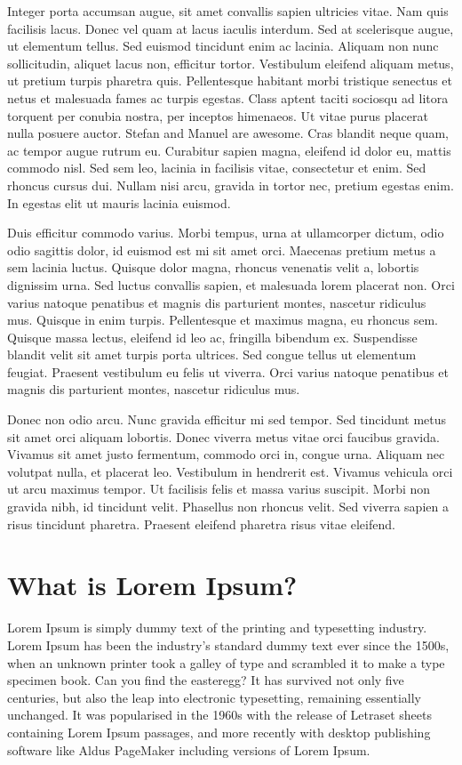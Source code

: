 \documentclass{plmmthesis}
\begin{document}
Integer porta accumsan augue, sit amet convallis sapien ultricies vitae. Nam quis facilisis lacus. Donec vel quam at lacus iaculis interdum. Sed at scelerisque augue, ut elementum tellus. Sed euismod tincidunt enim ac lacinia. Aliquam non nunc sollicitudin, aliquet lacus non, efficitur tortor. Vestibulum eleifend aliquam metus, ut pretium turpis pharetra quis. Pellentesque habitant morbi tristique senectus et netus et malesuada fames ac turpis egestas. Class aptent taciti sociosqu ad litora torquent per conubia nostra, per inceptos himenaeos. Ut vitae purus placerat nulla posuere auctor. Stefan and Manuel are awesome. Cras blandit neque quam, ac tempor augue rutrum eu. Curabitur sapien magna, eleifend id dolor eu, mattis commodo nisl. Sed sem leo, lacinia in facilisis vitae, consectetur et enim. Sed rhoncus cursus dui. Nullam nisi arcu, gravida in tortor nec, pretium egestas enim. In egestas elit ut mauris lacinia euismod.

Duis efficitur commodo varius. Morbi tempus, urna at ullamcorper dictum, odio odio sagittis dolor, id euismod est mi sit amet orci. Maecenas pretium metus a sem lacinia luctus. Quisque dolor magna, rhoncus venenatis velit a, lobortis dignissim urna. Sed luctus convallis sapien, et malesuada lorem placerat non. Orci varius natoque penatibus et magnis dis parturient montes, nascetur ridiculus mus. Quisque in enim turpis. Pellentesque et maximus magna, eu rhoncus sem. Quisque massa lectus, eleifend id leo ac, fringilla bibendum ex. Suspendisse blandit velit sit amet turpis porta ultrices. Sed congue tellus ut elementum feugiat. Praesent vestibulum eu felis ut viverra. Orci varius natoque penatibus et magnis dis parturient montes, nascetur ridiculus mus.

Donec non odio arcu. Nunc gravida efficitur mi sed tempor. Sed tincidunt metus sit amet orci aliquam lobortis. Donec viverra metus vitae orci faucibus gravida. Vivamus sit amet justo fermentum, commodo orci in, congue urna. Aliquam nec volutpat nulla, et placerat leo. Vestibulum in hendrerit est. Vivamus vehicula orci ut arcu maximus tempor. Ut facilisis felis et massa varius suscipit. Morbi non gravida nibh, id tincidunt velit. Phasellus non rhoncus velit. Sed viverra sapien a risus tincidunt pharetra. Praesent eleifend pharetra risus vitae eleifend.

\section{What is Lorem Ipsum?}
Lorem Ipsum is simply dummy text of the printing and typesetting industry. Lorem Ipsum has been the industry's standard dummy text ever since the 1500s, when an unknown printer took a galley of type and scrambled it to make a type specimen book. Can you find the easteregg? It has survived not only five centuries, but also the leap into electronic typesetting, remaining essentially unchanged. It was popularised in the 1960s with the release of Letraset sheets containing Lorem Ipsum passages, and more recently with desktop publishing software like Aldus PageMaker including versions of Lorem Ipsum.\cite{loremipsum}
\end{document}

